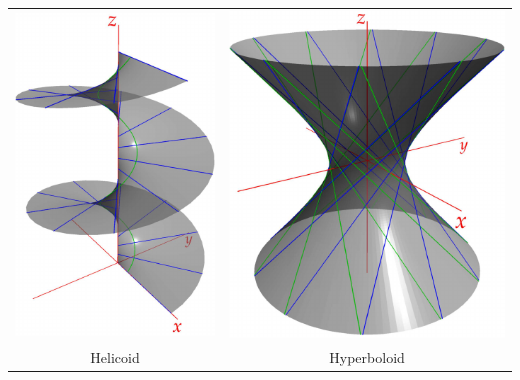 \begin{examples}{}{}
\begin{enumerate}
		\begin{center}
			\begin{tabular}{c@{\qquad\qquad}c}
				\href{http://www.math.uci.edu/~ndonalds/math162a/surfaces-helicoid.html}{\includegraphics{surfaces-helicoid}}
				&
				\href{http://www.math.uci.edu/~ndonalds/math162a/surfaces-hyper.html}{\includegraphics{surfaces-hyper}}
				\\
				Helicoid
				&
				Hyperboloid
			\end{tabular}
		\end{center}
	
	\end{enumerate}
\end{examples}



